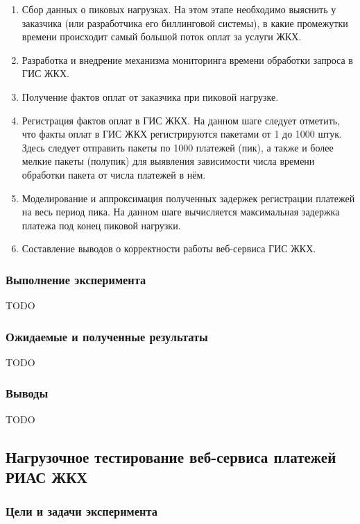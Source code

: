 \begin{enumerate}
	\item Сбор данных о пиковых нагрузках. На этом этапе необходимо выяснить у заказчика (или разработчика его биллинговой системы), в какие промежутки времени происходит самый большой поток оплат за услуги ЖКХ.
	\item Разработка и внедрение механизма мониторинга времени обработки запроса в ГИС ЖКХ.
	\item Получение фактов оплат от заказчика при пиковой нагрузке.
	\item Регистрация фактов оплат в ГИС ЖКХ. На данном шаге следует отметить, что факты оплат в ГИС ЖКХ регистрируются пакетами от 1 до 1000 штук. Здесь следует отправить пакеты по 1000 платежей (пик), а также и более мелкие пакеты (полупик) для выявления зависимости числа времени обработки пакета от числа платежей в нём.
	\item Моделирование и аппроксимация полученных задержек регистрации платежей на весь период пика. На данном шаге вычисляется максимальная задержка платежа под конец пиковой нагрузки.
	\item Составление выводов о корректности работы веб-сервиса ГИС ЖКХ.
\end{enumerate}

\subsubsection*{Выполнение эксперимента}

TODO

\subsubsection*{Ожидаемые и полученные результаты}

TODO

\subsubsection*{Выводы}

TODO

\subsection{Нагрузочное тестирование веб-сервиса платежей РИАС ЖКХ}

\subsubsection*{Цели и задачи эксперимента}


